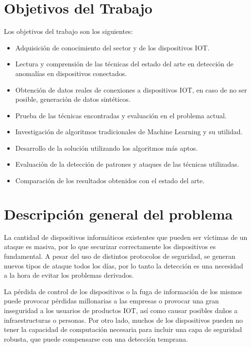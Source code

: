 \section{Objetivos del Trabajo}
Los objetivos del trabajo son los siguientes:

\begin{itemize}
  \item Adquisición de conocimiento del sector y de los dispositivos IOT.
  \item Lectura y comprensión de las técnicas del estado del arte en detección de anomalías en dispositivos conectados.
  \item Obtención de datos reales de conexiones a dispositivos IOT, en caso de no ser posible, generación de datos sintéticos.
  \item Prueba de las técnicas encontradas y evaluación en el problema actual.
  \item Investigación de algoritmos tradicionales de Machine Learning y su utilidad.
  \item Desarrollo de la solución utilizando los algoritmos más aptos.
  \item Evaluación de la detección de patrones y ataques de las técnicas utilizadas.
  \item Comparación de los resultados obtenidos con el estado del arte.
\end{itemize}

\section{Descripción general del problema}

La cantidad de dispositivos informáticos existentes que pueden ser víctimas de un ataque es masiva, por lo que securizar correctamente los dispositivos es fundamental. A pesar del uso de distintos protocolos de seguridad, se generan nuevos tipos de ataque todos los días, por lo tanto la detección es una necesidad a la hora de evitar los problemas derivados.



La pérdida de control de los dispositivos o la fuga de información de los mismos puede provocar pérdidas millonarias a las empresas o provocar una gran inseguridad a los usuarios de productos IOT, así como causar posibles daños a infraestructuras o personas. Por otro lado, muchos de los dispositivos pueden no tener la capacidad de computación necesaria para incluir una capa de seguridad robusta, que puede compensarse con una detección temprana. 


